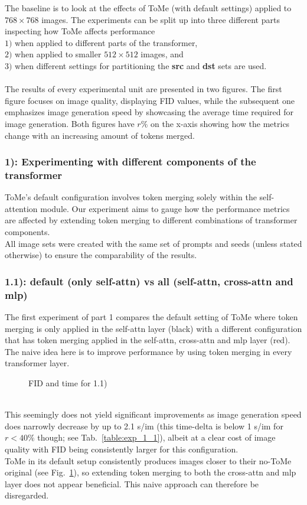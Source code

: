 The baseline is to look at the effects of ToMe (with default settings) applied to $768 \times 768$ images. The experiments can be split up into three different parts inspecting how ToMe affects performance\\ \(1)\) when applied to different parts of the transformer,\\ \(2)\) when applied to smaller $512 \times 512$ images, and\\ \(3)\) when different settings for partitioning the \textbf{src} and \textbf{dst} sets are used.\\
\\
The results of every experimental unit are presented in two figures. The first figure focuses on image quality, displaying FID values, while the subsequent one emphasizes image generation speed by showcasing the average time required for image generation.
Both figures have \(r\%\) on the x-axis showing how the metrics change with an increasing amount of tokens merged.

\subsubsection*{1): Experimenting with different components of the transformer}
ToMe's default configuration involves token merging solely within the self-attention module.
Our experiment aims to gauge how the performance metrics are affected by extending token merging to different combinations of transformer components.\\
All image sets were created with the same set of prompts and seeds (unless stated otherwise) to ensure the comparability of the results.



\subsubsection*{1.1): default (only self-attn) vs all (self-attn, cross-attn and mlp)}
The first experiment of part 1 compares the default setting of ToMe where token merging is only applied in the self-attn layer (black) with a different configuration that has token merging applied in the self-attn, cross-attn and mlp layer (red). 
The naive idea here is to improve performance by using token merging in every transformer layer.
\begin{figure}[!htb]
\label{fig:exp_1_1}
   
   
\caption{FID and time for 1.1)}
\label{fig:exp_1_1}
\end{figure}\\
This seemingly does not yield significant improvements as image generation speed does narrowly decrease by up to 2.1 s/im (this time-delta is below 1 s/im for $r<40\%$ though; see Tab.~\ref{table:exp_1_1}), albeit at a clear cost of image quality with FID being consistently larger for this configuration. \\
ToMe in its default setup consistently produces images closer to their no-ToMe original (see Fig.~\ref{fig:exp_1_1}), so extending token merging to both the cross-attn and mlp layer does not appear beneficial. This naive approach can therefore be disregarded.



